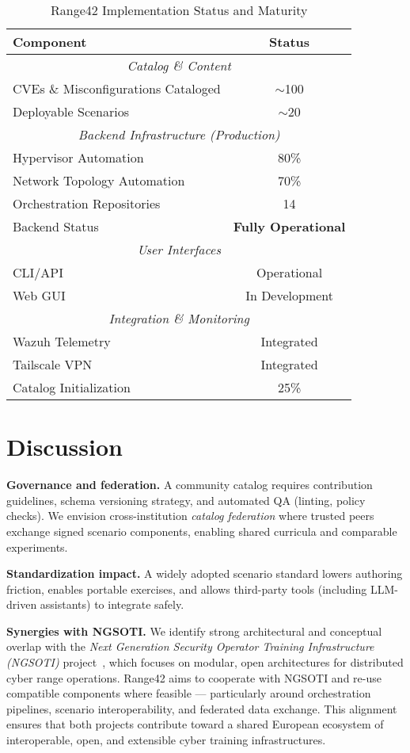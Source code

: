 \documentclass[11pt]{article}
\begin{document}
\begin{table}[h]
\centering
\caption{Range42 Implementation Status and Maturity}
\label{tab:implementation}
\begin{tabular}{lc}
\hline
\textbf{Component} & \textbf{Status} \\
\hline
\multicolumn{2}{c}{\textit{Catalog \& Content}} \\
CVEs \& Misconfigurations Cataloged & $\sim$100 \\
Deployable Scenarios & $\sim$20 \\
\hline
\multicolumn{2}{c}{\textit{Backend Infrastructure (Production)}} \\
Hypervisor Automation & 80\% \\
Network Topology Automation & 70\% \\
Orchestration Repositories & 14 \\
Backend Status & \textbf{Fully Operational} \\
\hline
\multicolumn{2}{c}{\textit{User Interfaces}} \\
CLI/API & Operational \\
Web GUI & In Development \\
\hline
\multicolumn{2}{c}{\textit{Integration \& Monitoring}} \\
Wazuh Telemetry & Integrated \\
Tailscale VPN & Integrated \\
Catalog Initialization & 25\% \\
\hline
\end{tabular}
\end{table}

\section{Discussion}

\textbf{Governance and federation.} A community catalog requires contribution guidelines, schema versioning strategy, and automated QA (linting, policy checks).
We envision cross-institution \emph{catalog federation} where trusted peers exchange signed scenario components, enabling shared curricula and comparable experiments.

\textbf{Standardization impact.} A widely adopted scenario standard lowers authoring friction, enables portable exercises, and allows third-party tools (including LLM-driven assistants) to integrate safely.

\textbf{Synergies with NGSOTI.} 
We identify strong architectural and conceptual overlap with the \emph{Next Generation Security Operator Training Infrastructure (NGSOTI)} project~\cite{ngsoti}, 
which focuses on modular, open architectures for distributed cyber range operations. 
Range42 aims to cooperate with NGSOTI and re-use compatible components where feasible --- particularly around orchestration pipelines, scenario interoperability, and federated data exchange. 
This alignment ensures that both projects contribute toward a shared European ecosystem of interoperable, open, and extensible cyber training infrastructures.
\end{document}
